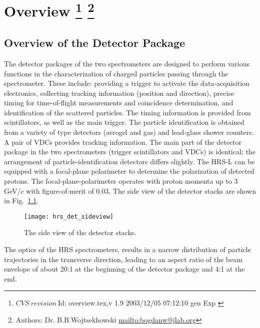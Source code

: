 \chapter[Overview]{Overview
\footnote{
  $CVS~revision~ $Id: overview.tex,v 1.9 2003/12/05 07:12:10 gen Exp $ $
}
\footnote{Authors: Dr. B.B.Wojtsekhowski \url{mailto:bogdanw@jlab.org}}
}
\label{chap:hrs_det}

\section{Overview of the Detector Package}

The detector packages of the two spectrometers are designed 
to perform various functions 
in the characterization of charged particles passing through the spectrometer. 
These include: providing a trigger to activate the data-acquisition 
electronics, collecting tracking information (position and direction), 
precise timing for time-of-flight measurements and coincidence determination, 
and identification of the scattered particles. 
The timing information is provided from scintillators, as well as the
main trigger. The particle identification is obtained from a 
variety of \Cherenkov{}  type detectors (aerogel and gas) and 
lead-glass shower counters. 
A pair of VDCs provides tracking information.
The main part of the detector package in the two spectrometers 
(trigger scintillators and VDCs) is identical; 
the arrangement of particle-identification detectors differs slightly.
The HRS-L can be equipped with a focal-plane polarimeter to determine 
the polarization of detected protons.
The focal-plane-polarimeter operates with proton momenta up 
to 3 GeV/$c$ with figure-of-merit of 0.03.
The side view of the detector stacks are shown in Fig.~\ref{fig:side-view}.
%
\begin{figure}[p]
\texttt{[image: hrs\_det\_sideview]}
\caption[The side view of the detector stacks]
{The side view of the detector stacks.}
\label{fig:side-view}
\end{figure}
%

The optics of the HRS spectrometers, results in a narrow distribution of 
particle trajectories in the transverse direction, leading 
to an aspect ratio of the beam envelope of about 20:1 at 
the beginning of the detector package and 4:1 at the end.

